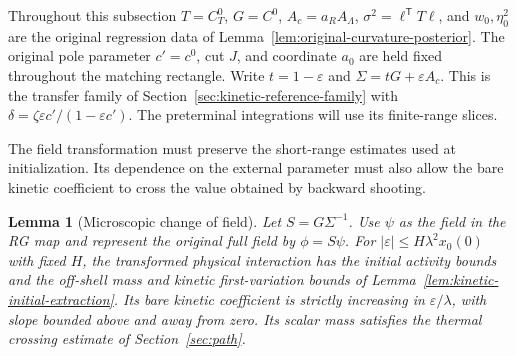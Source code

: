 \documentclass[11pt]{article}
\newtheorem{lemma}[theorem]{Lemma}
\theoremstyle{definition}
\begin{document}
Throughout this subsection \(T=C_T^0\), \(G=C^0\), \(A_c=a_RA_\Lambda\),
\(\sigma^2=\ell^{\mathsf T}T\ell\), and \(w_0,\eta_0^2\) are the
original regression data of Lemma~\ref{lem:original-curvature-posterior}.
The original pole parameter \(c'=c^0\), cut \(J\), and coordinate
\(a_0\) are held fixed throughout the matching rectangle.
Write \(t=1-\varepsilon\) and
\(\Sigma=tG+\varepsilon A_c\). This is the transfer family of
Section~\ref{sec:kinetic-reference-family} with
\(\delta=\zeta\varepsilon c'/(1-\varepsilon c')\).
The preterminal integrations will use its finite-range slices.

The field transformation must preserve the short-range estimates
used at initialization. Its dependence on the external parameter
must also allow the bare kinetic coefficient to cross the value
obtained by backward shooting.

\begin{lemma}[Microscopic change of field]
\label{lem:aligned-initialization}
Let \(S=G\Sigma^{-1}\). Use \(\psi\) as the field in the RG map
and represent the original full field by \(\phi=S\psi\).
For \(|\varepsilon|\le H\lambda^2x_0(0)\) with fixed \(H\), the
transformed physical interaction has the initial activity bounds
and the off-shell mass and kinetic first-variation bounds of
Lemma~\ref{lem:kinetic-initial-extraction}. Its bare kinetic
coefficient is strictly increasing in \(\varepsilon/\lambda\),
with slope bounded above and away from zero. Its scalar mass
satisfies the thermal crossing estimate of Section~\ref{sec:path}.
\end{lemma}
\end{document}
